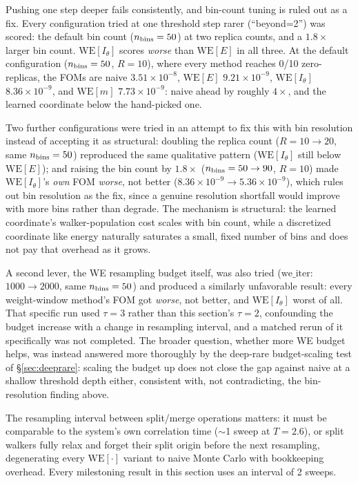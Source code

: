 \documentclass[a4paper,fleqn]{cas-sc}
\begin{document}
	Pushing one step deeper fails consistently, and bin-count tuning is ruled out as a
	fix. Every configuration tried at one threshold step rarer (``beyond=2'') was scored:
	the default bin count ($n_{\rm bins}=50$) at two replica counts, and a $1.8\times$ larger
	bin count. $\mathrm{WE}[I_\theta]$ scores \emph{worse} than $\mathrm{WE}[E]$ in all
	three. At the default configuration ($n_{\rm bins}=50$, $R=10$), where every method
	reaches 0/10 zero-replicas, the FOMs are naive $3.51\times10^{-8}$, $\mathrm{WE}[E]$
	$9.21\times10^{-9}$, $\mathrm{WE}[I_\theta]$ $8.36\times10^{-9}$, and $\mathrm{WE}[m]$
	$7.73\times10^{-9}$: naive ahead by roughly $4\times$, and the learned coordinate below
	the hand-picked one.
	
	Two further configurations were tried in an attempt to fix this with bin resolution instead
	of accepting it as structural: doubling the replica count ($R=10\to20$, same $n_{\rm
		bins}=50$) reproduced the same qualitative pattern ($\mathrm{WE}[I_\theta]$ still below
	$\mathrm{WE}[E]$); and raising the bin count by $1.8\times$ ($n_{\rm bins}=50\to90$, $R=10$)
	made $\mathrm{WE}[I_\theta]$'s \emph{own} FOM \emph{worse}, not better
	($8.36\times10^{-9}\to5.36\times10^{-9}$), which rules out bin resolution as the fix, since
	a genuine resolution shortfall would improve with more bins rather than degrade. The
	mechanism is structural: the learned coordinate's walker-population cost scales with bin
	count, while a discretized coordinate like energy naturally saturates a small, fixed
	number of bins and does not pay that overhead as it grows.
	
	A second lever, the WE resampling budget itself, was also tried
	($\mathrm{we\_iter}$: $1000\to2000$, same $n_{\rm bins}=50$) and produced a similarly
	unfavorable result: every weight-window method's FOM got \emph{worse}, not better, and
	$\mathrm{WE}[I_\theta]$ worst of all. That specific run used $\tau=3$ rather than this
	section's $\tau=2$, confounding the budget increase with a change in resampling interval,
	and a matched rerun of it specifically was not completed. The broader question, whether
	more WE budget helps, was instead answered more thoroughly by the deep-rare
	budget-scaling test of \S\ref{sec:deeprare}: scaling the budget up does not close the gap
	against naive at a shallow threshold depth either, consistent with, not contradicting,
	the bin-resolution finding above.
	
	The resampling interval between split/merge operations matters: it must be comparable to
	the system's own correlation time ($\sim$1 sweep at $T=2.6$), or split walkers fully relax
	and forget their split origin before the next resampling, degenerating every
	$\mathrm{WE}[\cdot]$ variant to naive Monte Carlo with bookkeeping overhead. Every
	milestoning result in this section uses an interval of 2 sweeps.
	
\end{document}
